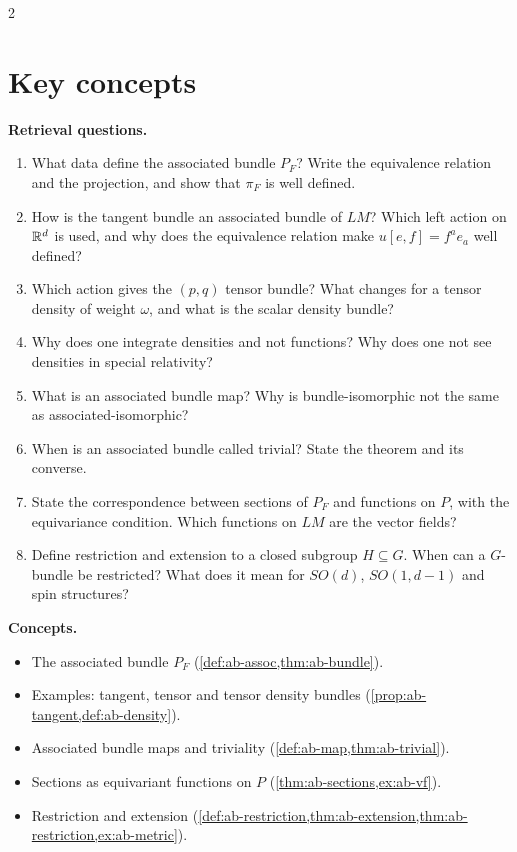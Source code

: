 \begin{paracol}{2}
\section*{Key concepts}
\begin{keyconcepts}
\textbf{Retrieval questions.}
\begin{enumerate}
  \item What data define the associated bundle $P_F$? Write the equivalence relation and the projection, and show that $\pi_F$ is well defined.
  \item How is the tangent bundle an associated bundle of $LM$? Which left action on $\mathbb{R}^d$ is used, and why does the equivalence relation make $u[e,f]=f^ae_a$ well defined?
  \item Which action gives the $(p,q)$ tensor bundle? What changes for a tensor density of weight $\omega$, and what is the scalar density bundle?
  \item Why does one integrate densities and not functions? Why does one not see densities in special relativity?
  \item What is an associated bundle map? Why is bundle-isomorphic not the same as associated-isomorphic?
  \item When is an associated bundle called trivial? State the theorem and its converse.
  \item State the correspondence between sections of $P_F$ and functions on $P$, with the equivariance condition. Which functions on $LM$ are the vector fields?
  \item Define restriction and extension to a closed subgroup $H\subseteq G$. When can a $G$-bundle be restricted? What does it mean for $SO(d)$, $SO(1,d-1)$ and spin structures?
\end{enumerate}
\textbf{Concepts.}
\begin{itemize}
  \item The associated bundle $P_F$ (\cref{def:ab-assoc,thm:ab-bundle}).
  \item Examples: tangent, tensor and tensor density bundles (\cref{prop:ab-tangent,def:ab-density}).
  \item Associated bundle maps and triviality (\cref{def:ab-map,thm:ab-trivial}).
  \item Sections as equivariant functions on $P$ (\cref{thm:ab-sections,ex:ab-vf}).
  \item Restriction and extension (\cref{def:ab-restriction,thm:ab-extension,thm:ab-restriction,ex:ab-metric}).
\end{itemize}
\end{keyconcepts}

\flushside
\end{paracol}
